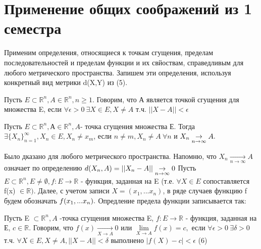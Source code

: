 \section{Применение общих соображений из 1 семестра}
Применим определения, относящиеся к точкам сгущения, пределам последовательностей и пределам функции и их свйоствам, справедливым для любого метрического пространства. Запишем эти определения, используя конкретный вид метрики d(X,Y) из (5).
\begin{definition}
	Пусть $E \subset \mathbb{R}^n, A \in \mathbb{R}^n , n \geq 1$. Говорим, что А является точкой сгущения для множества E, если $\forall \epsilon > 0 \  \exists X \in E, X \neq A $ т.ч. $||X-A|| < \epsilon$
\end{definition}
\begin{assertion}
	Пусть $E \subset \mathbb{R}^n, А \in \mathbb{R}^n, A $- точка сгущения множества Е. Тогда $\exists \{X_n\}_{n = 1}^{\infty}, X_n \in E, X_n \neq x_m$, если $n \neq m, X_n \neq A \ \forall n $ и $X_n \underset{n \to \infty}{\to} A. \\$
	\end{assertion}
Было дказано для любого метрического пространства. Напомню, что $X_n \underset{n \to \infty}{\to}A$ означает по определению $d(X_n,A) = ||X_n-A|| \underset{n \to \infty}{\to} 0 \\ $ 
Пусть $E \subset \mathbb{R}^n, E \neq \emptyset, f: E \to \mathbb{R}$ - функция, заданная на E (т.е. $\forall X \in E$ сопоставляется f(x) $\in \mathbb{R})$. Далее, с учетом записи $X = (x_1,...x_n)$, в ряде случаев функцию f будем обозначать $f(x_1,...x_n). \\$
Опредление предела функции записывается так:
\begin{definition}
	Пусть E $\subset \mathbb{R}^n, A$ -точка сгущения множества E, $f: E \to \mathbb{R}$ - функция, заданная на Е, $c \in \mathbb{R}$. Говорим, что $f(x) \underset{X \to A}{\to} 0$ или $\lim\limits_{X \to A}{f(x)}= c,$ если $\forall \epsilon > 0 \ \exists \delta > 0$ т.ч. $\forall X \in E, X \neq A, ||X-A|| < \delta$ выполнено $|f(X)-c|<\epsilon$ (6)
\end{definition}

